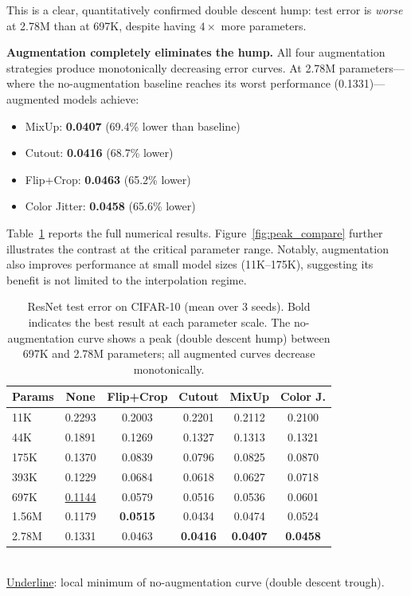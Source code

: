 This is a clear, quantitatively confirmed double descent hump: test error is \emph{worse} at 2.78M than at 697K, despite having $4\times$ more parameters.

\textbf{Augmentation completely eliminates the hump.} All four augmentation strategies produce monotonically decreasing error curves. At 2.78M parameters---where the no-augmentation baseline reaches its worst performance (0.1331)---augmented models achieve:

\begin{itemize}
    \item MixUp: \textbf{0.0407} (69.4\% lower than baseline)
    \item Cutout: \textbf{0.0416} (68.7\% lower)
    \item Flip+Crop: \textbf{0.0463} (65.2\% lower)
    \item Color Jitter: \textbf{0.0458} (65.6\% lower)
\end{itemize}

Table~\ref{tab:resnet_full} reports the full numerical results. Figure~\ref{fig:peak_compare} further illustrates the contrast at the critical parameter range. Notably, augmentation also improves performance at small model sizes (11K--175K), suggesting its benefit is not limited to the interpolation regime.

\begin{table}[t]
\centering
\caption{ResNet test error on CIFAR-10 (mean over 3 seeds). Bold indicates the best result at each parameter scale. The no-augmentation curve shows a peak (double descent hump) between 697K and 2.78M parameters; all augmented curves decrease monotonically.}
\label{tab:resnet_full}
\setlength{\tabcolsep}{4pt}
\small
\begin{tabular}{@{}lccccc@{}}
\toprule
Params & None & Flip+Crop & Cutout & MixUp & Color J. \\
\midrule
11K   & 0.2293 & 0.2003 & 0.2201 & 0.2112 & 0.2100 \\
44K   & 0.1891 & 0.1269 & 0.1327 & 0.1313 & 0.1321 \\
175K  & 0.1370 & 0.0839 & 0.0796 & 0.0825 & 0.0870 \\
393K  & 0.1229 & 0.0684 & 0.0618 & 0.0627 & 0.0718 \\
697K  & \underline{0.1144} & 0.0579 & 0.0516 & 0.0536 & 0.0601 \\
1.56M & 0.1179 & \textbf{0.0515} & 0.0434 & 0.0474 & 0.0524 \\
2.78M & 0.1331 & 0.0463 & \textbf{0.0416} & \textbf{0.0407} & \textbf{0.0458} \\
\bottomrule
\end{tabular}
{\\ \small \underline{Underline}: local minimum of no-augmentation curve (double descent trough).}
\end{table}

